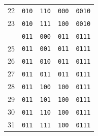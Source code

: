 \begin{minipage}[t]{0.48\textwidth}
\begin{tabular}{@{}r c c c c@{}}
22 & \texttt{010} & \texttt{110} & \texttt{000} & \texttt{0010} \\
23 & \texttt{010} & \texttt{111} & \texttt{100} & \texttt{0010} \\
\addlinespace[2pt]
24 & \texttt{011} & \texttt{000} & \texttt{011} & \texttt{0111} \\
25 & \texttt{011} & \texttt{001} & \texttt{011} & \texttt{0111} \\
26 & \texttt{011} & \texttt{010} & \texttt{011} & \texttt{0111} \\
27 & \texttt{011} & \texttt{011} & \texttt{011} & \texttt{0111} \\
28 & \texttt{011} & \texttt{100} & \texttt{100} & \texttt{0111} \\
29 & \texttt{011} & \texttt{101} & \texttt{100} & \texttt{0111} \\
30 & \texttt{011} & \texttt{110} & \texttt{100} & \texttt{0111} \\
31 & \texttt{011} & \texttt{111} & \texttt{100} & \texttt{0111} \\
\bottomrule
\end{tabular}
\end{minipage}\hfill
